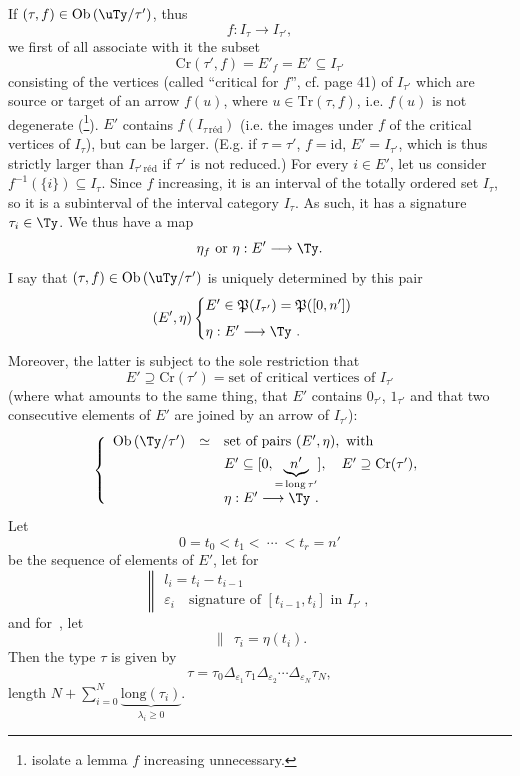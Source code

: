 If $(\tau, f) \in \mathrm{Ob}\,(\uTy/\tau')$, thus
\[
f : I_\tau \longrightarrow I_{\tau'},
\]
we first of all associate with it the subset
\[
\mathrm{Cr}(\tau', f) = E'_f = E' \subseteq I_{\tau'}
\]
consisting of the vertices (called ``critical for $f$'', cf. page 41) of $I_{\tau'}$ which are source or target of an arrow $f(u)$, where $u \in \mathrm{Tr}(\tau, f)$, i.e. $f(u)$ is not degenerate (\footnote[13]{isolate a lemma $f$ increasing unnecessary.}). $E'$ contains $f(I_{\tau\,\text{réd}})$ (i.e. the images under $f$ of the critical vertices of $I_\tau$),
but can be larger. (E.g. if $\tau = \tau'$, $f = \mathrm{id}$, $E' = I_{\tau'}$, which is thus strictly larger than $I_{\tau'\,\text{réd}}$ if $\tau'$ is not reduced.) For every $i \in E'$, let us consider $f^{-1}(\{i\}) \subseteq I_\tau$. Since $f$ increasing, it is an interval of the totally ordered set $I_\tau$, so it is a subinterval of the interval category $I_\tau$. As such, it has a signature $\tau_i \in \Ty$. We thus have a map
\[
\eta_f \text{ or } \eta : E' \longrightarrow \Ty.
\]
I say that $(\tau, f) \in \mathrm{Ob}\,(\uTy/\tau')$ is uniquely determined by this pair
\[
(E', \eta) \begin{cases} E' \in \mathfrak{P}(I_{\tau'}) = \mathfrak{P}([0,n']) \\[1ex] \eta : E' \longrightarrow \Ty\ . \end{cases}
\]
Moreover, the latter is subject to the sole restriction that
\[
E' \supseteq \mathrm{Cr}(\tau') = \text{set of critical vertices of } I_{\tau'}
\]
(where what amounts to the same thing, that $E'$ contains $0_{\tau'}$, $1_{\tau'}$ and that two consecutive elements of $E'$ are joined by an arrow of $I_{\tau'}$): %
\[
\left\{
\begin{array}{lcl}
\mathrm{Ob}\,(\Ty/\tau') & \simeq & \text{set of pairs } (E',\eta), \text{ with} \\[1ex]
 & & E' \subseteq [0, \underbrace{\ n'\ }_{=\,\mathrm{long}\,\tau'}], \quad E' \supseteq \mathrm{Cr}(\tau'), \\[1ex]
 & & \eta : E' \longrightarrow \Ty\ .
\end{array}
\right.
\]
Let
\[
0 = t_0 < t_1 < \ \cdots\ < t_r = n'
\]
be the sequence of elements of $E'$, let for 
\[
\left\|
\begin{array}{l}
l_i = t_i - t_{i-1} \\[1ex]
\varepsilon_i \quad \text{signature of } [t_{i-1}, t_i] \text{ in } I_{\tau'}\ ,
\end{array}
\right.
\]
and for \,, let
\[
\|\ \ \tau_i = \eta(t_i).
\]
Then the type $\tau$ is given by
\[
\tau = \tau_0 \Delta_{\varepsilon_1} \tau_1 \Delta_{\varepsilon_2} \cdots \Delta_{\varepsilon_N} \tau_N, \tag*{$(*)$}
\]
 length $N + \sum_{i=0}^N \underbrace{\mathrm{long}(\tau_i)}_{\lambda_i \geq 0}$.

